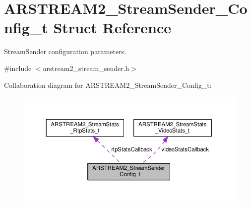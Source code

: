 \hypertarget{struct_a_r_s_t_r_e_a_m2___stream_sender___config__t}{}\section{A\+R\+S\+T\+R\+E\+A\+M2\+\_\+\+Stream\+Sender\+\_\+\+Config\+\_\+t Struct Reference}
\label{struct_a_r_s_t_r_e_a_m2___stream_sender___config__t}


Stream\+Sender configuration parameters.  




{\ttfamily \#include $<$arstream2\+\_\+stream\+\_\+sender.\+h$>$}



Collaboration diagram for A\+R\+S\+T\+R\+E\+A\+M2\+\_\+\+Stream\+Sender\+\_\+\+Config\+\_\+t\+:
\nopagebreak
\begin{figure}[H]
\begin{center}
\leavevmode
\includegraphics[width=350pt]{struct_a_r_s_t_r_e_a_m2___stream_sender___config__t__coll__graph}
\end{center}
\end{figure}

